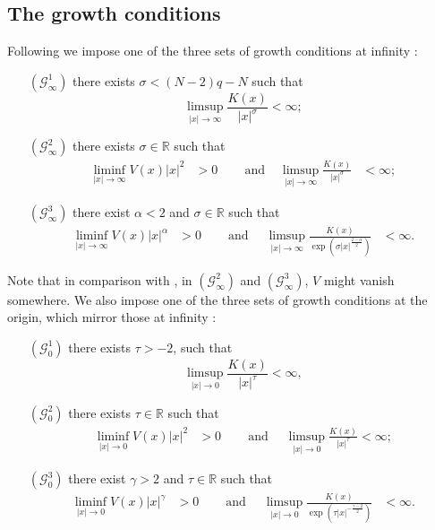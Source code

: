 \documentclass[a4paper]{amsart}
\begin{document}
\subsection{The growth conditions}
Following  we impose one of the three sets of growth conditions at infinity :
\begin{itemize}
\item[$(\mathcal{G}_{\infty}^1)$] there exists $\sigma < (N-2)q-N$ such that
\[
  \limsup_{{\left| {x} \right|} \to \infty} \frac{K(x)}{{\left| {x} \right|}^\sigma} < \infty;
\]
\item[$(\mathcal{G}_{\infty}^2)$] there exists $\sigma \in {\mathbb{R}}$ such that
 \begin{align*}
  \liminf_{{\left| {x} \right|} \rightarrow \infty} V(x) {\left| {x} \right|}^{2} &> 0\ &&\text{ and } &  \limsup_{{\left| {x} \right|} \to \infty} \frac{K(x)}{{\left| {x} \right|}^\sigma} &<\infty;
 \end{align*}
\item[$(\mathcal{G}_{\infty}^3)$] there exist $\alpha < 2$ and $\sigma \in {\mathbb{R}}$ such that
 \begin{align*}
  \liminf_{{\left| {x} \right|} \rightarrow \infty} V(x) {\left| {x} \right|}^{\alpha} &> 0\ & & \text{ and }\ &\limsup_{{\left| {x} \right|} \to \infty} \frac{K(x)}{\exp ( \sigma
{\left| {x} \right|}^{\frac{2-\alpha}{2}} )} &< \infty.
 \end{align*}
\end{itemize}
Note that in comparison with \cite{BVS}, in $(\mathcal{G}_{\infty}^2)$ and $(\mathcal{G}_{\infty}^3)$, $V$ might vanish somewhere.
We also impose one of the three sets of growth conditions at the origin, which mirror those at infinity :
\begin{itemize}
\item[$(\mathcal{G}_{0}^1)$] there exists $\tau > -2$, such that
\[
   \limsup_{{\left| {x} \right|} \to 0} \frac{K(x)}{{\left| {x} \right|}^{\tau}} < \infty,
\]
\item[$(\mathcal{G}_{0}^2)$] there exists $\tau \in {\mathbb{R}}$ such that
 \begin{align*}
  \liminf_{{\left| {x} \right|} \rightarrow 0} V(x) {\left| {x} \right|}^{2} &> 0\ &&\text{ and }\ &\limsup_{{\left| {x} \right|} \to 0} \frac{K(x)}{{\left| {x} \right|}^{\tau}} < \infty;
 \end{align*}
\item[$(\mathcal{G}_{0}^3)$]
 there exist $\gamma > 2$ and $\tau \in {\mathbb{R}}$ such that
 \begin{align*}
  \liminf_{{\left| {x} \right|} \rightarrow 0} V(x) {\left| {x} \right|}^{\gamma} &> 0\ &&\text{ and }\ & \limsup_{{\left| {x} \right|} \to 0} \frac{K(x)}{\exp ( \tau
{\left| {x} \right|}^{-\frac{\gamma-2}{2}} )} &< \infty.
 \end{align*}
\end{itemize}
\end{document}
